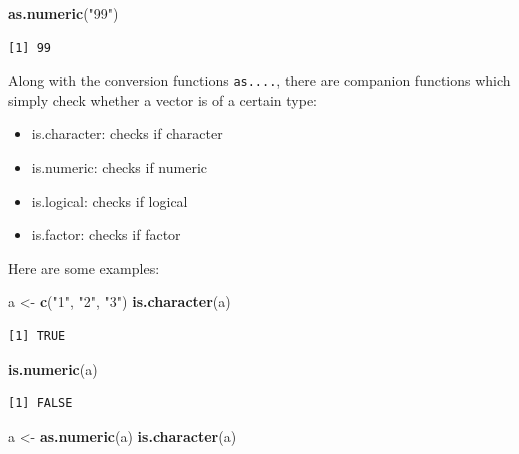 \documentclass[
]{article}
\newenvironment{Shaded}{\begin{snugshade}}{\end{snugshade}}
\newcommand{\KeywordTok}[1]{\textcolor[rgb]{0.13,0.29,0.53}{\textbf{#1}}}
\newcommand{\NormalTok}[1]{#1}
\newcommand{\StringTok}[1]{\textcolor[rgb]{0.31,0.60,0.02}{#1}}
\providecommand{\tightlist}{%
  \setlength{\itemsep}{0pt}\setlength{\parskip}{0pt}}
\begin{document}
\begin{Shaded}
\begin{Highlighting}[]
\KeywordTok{as.numeric}\NormalTok{(}\StringTok{"99"}\NormalTok{)}
\end{Highlighting}
\end{Shaded}

\begin{verbatim}
[1] 99
\end{verbatim}

Along with the conversion functions \texttt{as....}, there are companion functions which simply check whether a vector is of a certain type:

\begin{itemize}
\tightlist
\item
  is.character: checks if character
\item
  is.numeric: checks if numeric
\item
  is.logical: checks if logical
\item
  is.factor: checks if factor
\end{itemize}

Here are some examples:

\begin{Shaded}
\begin{Highlighting}[]
\NormalTok{a <-}\StringTok{ }\KeywordTok{c}\NormalTok{(}\StringTok{"1"}\NormalTok{, }\StringTok{"2"}\NormalTok{, }\StringTok{"3"}\NormalTok{)}
\KeywordTok{is.character}\NormalTok{(a)}
\end{Highlighting}
\end{Shaded}

\begin{verbatim}
[1] TRUE
\end{verbatim}

\begin{Shaded}
\begin{Highlighting}[]
\KeywordTok{is.numeric}\NormalTok{(a)}
\end{Highlighting}
\end{Shaded}

\begin{verbatim}
[1] FALSE
\end{verbatim}

\begin{Shaded}
\begin{Highlighting}[]
\NormalTok{a <-}\StringTok{ }\KeywordTok{as.numeric}\NormalTok{(a)}
\KeywordTok{is.character}\NormalTok{(a)}
\end{Highlighting}
\end{Shaded}
\end{document}
